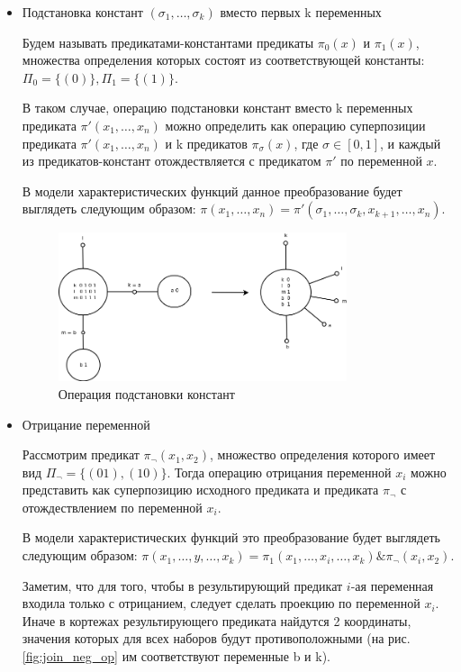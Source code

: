 \documentclass[12pt]{extarticle}
\begin{document}
\begin{itemize}
    \item Подстановка констант $(\sigma_1, \dots, \sigma_k)$ вместо первых k переменных

    Будем называть предикатами-константами предикаты $\pi_0(x)$ и $\pi_1(x)$, множества определения которых состоят
    из соответствующей константы: $\Pi_0=\{ (0) \}, \Pi_1=\{ (1) \}$.

    В таком случае, операцию подстановки констант вместо k переменных предиката $\pi'(x_1, \dots, x_n)$ 
    можно определить как операцию суперпозиции предиката $\pi'(x_1, \dots, x_n)$ и k предикатов 
    $\pi_{\sigma}(x)$, где $\sigma \in [0,1]$, и каждый из предикатов-констант отождествляется с предикатом $\pi'$ 
    по переменной $x$.

    В модели характеристических функций данное преобразование будет выглядеть следующим образом:
    $\pi(x_1, \dots, x_n) = \pi'(\sigma_1, \dots, \sigma_k, x_{k+1}, \dots, x_n)$. 
    
    \begin{figure}[htb]
    \centering
    \includegraphics[width=0.8\textwidth]{join_const_op.png}
    \caption{Операция подстановки констант}
    \label{fig:join_const_op}
    \samepage
    \end{figure}

    \item Отрицание переменной

    Рассмотрим предикат $\pi_{\neg}(x_1, x_2)$, множество определения которого имеет вид $\Pi_{\neg} = \{ (01), (10) \}$.
    Тогда операцию отрицания переменной $x_i$ можно представить как суперпозицию исходного предиката и предиката $\pi_{\neg}$
    с отождествлением по переменной $x_i$.
    
    В модели характеристических функций это преобразование будет выглядеть следующим образом:
    $\pi(x_1, \dots, y, \dots, x_k) = \pi_1(x_1, \dots, x_i, \dots, x_k) \& \pi_{\neg}(x_i, x_2)$.

    Заметим, что для того, чтобы в результирующий предикат $i$-ая переменная входила только с отрицанием, следует сделать 
    проекцию по переменной $x_i$. Иначе в кортежах результирующего предиката найдутся 2 координаты, значения которых
    для всех наборов будут противоположными (на рис. \ref{fig:join_neg_op} им соответствуют переменные b и k).


\end{itemize}
\end{document}
